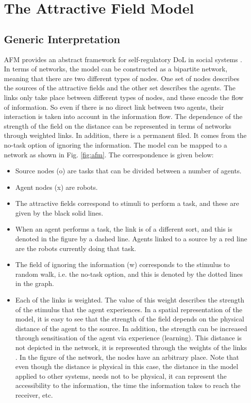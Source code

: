 \documentclass{llncs}
\begin{document}
\section{The Attractive Field Model}
\label{sec:model}
\subsection{Generic Interpretation}
AFM provides an abstract framework for self-regulatory DoL in social systems \cite{Elsa}. In terms of networks, the model can be constructed as a bipartite network, meaning that there are two different types of nodes. One set of nodes describes the sources of the attractive fields and the other set describes the agents. The links only take place between different types of nodes, and these encode the flow of information. So even if there is no direct link between two agents, their interaction is taken into account in the information flow. The dependence of the strength of the field on the distance can be represented in terms of networks through weighted links. In addition, there is a permanent filed. It comes from the no-task option of ignoring the information. The model can be mapped to a network as shown in Fig. \ref{fig:afm}. The correspondence is given below:
\begin{itemize}
\item Source nodes (o) are tasks that can be divided between a number of agents.
\item Agent nodes (x) are robots.
\item The attractive fields correspond to stimuli to perform a task, and these are given by the black solid lines.
\item When an agent performs a task, the link is of a different sort, and this is denoted in the figure by a dashed line. Agents linked to a source by a red line are the robots currently doing that task. 
\item The field of ignoring the information (w) corresponds to the stimulus to random walk, i.e. the no-task option, and this is denoted by the dotted lines in the graph. 
\item Each of the links is weighted. The value of this weight describes the strength of the stimulus that the agent experiences. In a spatial representation of the model, it is easy to see that the strength of the field depends on the physical distance of the agent to the source. In addition, the strength can be increased through sensitisation of the agent via experience (learning). This distance is not depicted in the network, it is represented through the weights of the links . In the figure of the network, the nodes have an arbitrary place. Note that even though the distance is physical in this case, the distance in the model applied to other systems, needs not to be physical, it can represent the accessibility to the information, the time the information takes to reach the receiver, etc. 
\end{itemize}
\end{document}
